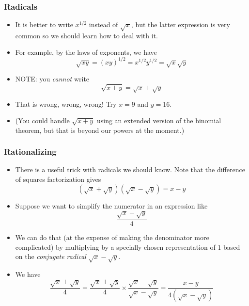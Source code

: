 \documentclass[serif,ignorenonframetext]{beamer}
\begin{document}
\begin{frame}
  \frametitle{Radicals}
  \begin{itemize}[<+->]
  \item It is better to write $x^{1/2}$ instead of $\sqrt{x}$, but the
    latter expression is very common so we should learn how to deal
    with it.
  \item For example, by the laws of exponents, we have
    \begin{equation*}
      \sqrt{xy} = (xy)^{1/2} = x^{1/2} y^{1/2} = \sqrt{x} \sqrt{y}
    \end{equation*}
  \item NOTE: you \textit{cannot} write
    \begin{equation*}
      \sqrt{x+y} = \sqrt{x} + \sqrt{y}
    \end{equation*}
  \item That is wrong, wrong, wrong!  Try $x=9$ and $y=16$.
  \item (You could handle $\sqrt{x+y}$ using an extended version of the
    binomial theorem, but that is beyond our powers at the moment.)
  \end{itemize}
\end{frame}

\begin{frame}
  \frametitle{Rationalizing}
  \begin{itemize}[<+->]
  \item There is a useful trick with radicals we should know.  Note
    that the difference of squares factorization gives
    \begin{equation*}
      (\sqrt{x}+\sqrt{y})(\sqrt{x}-\sqrt{y}) = x-y
    \end{equation*}
  \item Suppose we want to simplify the numerator in an expression
    like
    \begin{equation*}
      \frac{\sqrt{x}+\sqrt{y}}{4}
    \end{equation*}
  \item We can do that (at the expense of making the denominator more
    complicated) by multiplying by a specially chosen representation
    of $1$ based on the \textit{conjugate radical} $\sqrt{x}-\sqrt{y}$.
  \item We have
    \begin{equation*}
      \frac{\sqrt{x}+\sqrt{y}}{4} 
      = \frac{\sqrt{x}+\sqrt{y}}{4} \times
      \frac{\sqrt{x}-\sqrt{y}}{\sqrt{x}-\sqrt{y}} 
      = \frac{x-y}{4(\sqrt{x}-\sqrt{y})}
    \end{equation*}
  \end{itemize}
\end{frame}
\end{document}
